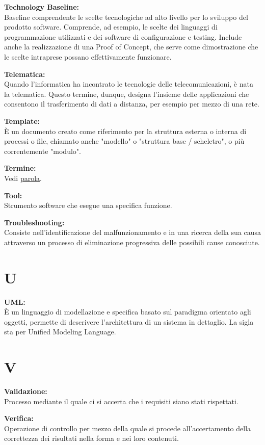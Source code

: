 \documentclass[a4paper, oneside, openany, dvipsnames, table]{article}
\begin{document}
 \textbf{Technology Baseline:} \\Baseline comprendente le scelte tecnologiche ad alto livello per lo sviluppo 
 del prodotto software. Comprende, ad esempio, le scelte dei linguaggi di programmazione utilizzati e dei 
 software di configurazione e testing. Include anche la realizzazione di una Proof of Concept, che serve 
 come dimostrazione che le scelte intraprese possano effettivamente funzionare.
 
\textbf{Telematica:}\\ Quando l'informatica ha incontrato le tecnologie delle telecomunicazioni, è nata la telematica. Questo termine, dunque, designa l'insieme delle applicazioni che consentono il trasferimento di dati a distanza, per esempio per mezzo di una rete. 

\textbf{Template:}\\ \`E un documento creato come riferimento per la struttura esterna o interna di processi o file, chiamato anche "modello" o "struttura base / scheletro", o più correntemente "modulo".

\textbf{Termine:}\\
Vedi \hyperref[par:parola]{parola}.

\textbf{Tool:}\\	Strumento software che esegue una specifica funzione.

\textbf{Troubleshooting:}\\	Consiste nell'identificazione del malfunzionamento e in una ricerca della sua causa attraverso un processo di eliminazione progressiva delle possibili cause conosciute.

\newpage 
\section{U}

\textbf{UML:}\\ \`E un linguaggio di modellazione e specifica basato sul paradigma orientato agli oggetti, permette di descrivere l'architettura di un sistema in dettaglio. La sigla sta per Unified Modeling Language.

\newpage
\section{V}
\textbf{Validazione:}\\	Processo mediante il quale ci si accerta che i requisiti siano stati rispettati.

\textbf{Verifica:}\\	Operazione di controllo per mezzo della quale si procede all'accertamento della correttezza dei risultati nella forma e nei loro contenuti.
\end{document}
